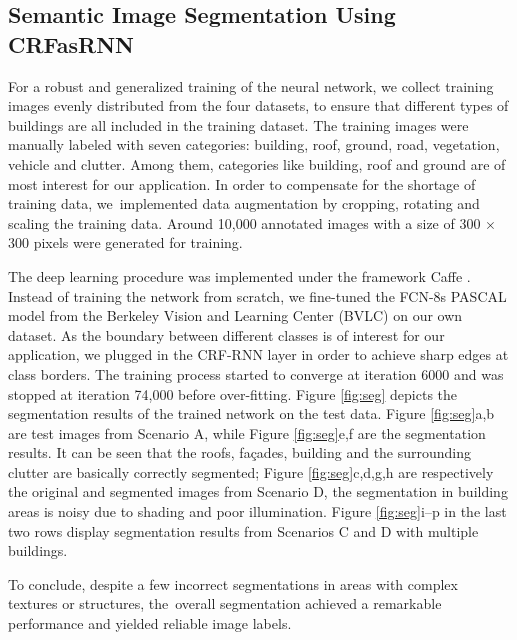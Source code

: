 \documentclass[remotesensing,article,accept,moreauthors,pdftex,10pt,a4paper]{mdpi}
\theoremstyle{mdpi}
\newcounter{ex}
\newcounter{re}
\begin{document}

\subsection{Semantic Image Segmentation Using CRFasRNN}
For a robust and generalized training of the neural network, we collect training images evenly distributed from the four datasets, to ensure that different types of buildings are all included in the training dataset. The training images were manually labeled with seven categories: building, roof, ground, road, vegetation, vehicle and clutter. Among them, categories like building, roof and ground are of most interest for our application. In order to compensate for the shortage of training data, we~implemented data augmentation by cropping, rotating and scaling the training data. Around 10,000 annotated images with a size of 300 $\times$ 300 pixels were generated for training.


The deep learning procedure was implemented under the framework Caffe \cite{jia2014caffe}. Instead of training the network from scratch, we fine-tuned the FCN-8s PASCAL model from the Berkeley Vision and Learning Center (BVLC) on our own dataset. As the boundary between different classes is of interest for our application, we plugged in the CRF-RNN layer in order to achieve sharp edges at class borders. The training process started to converge at iteration 6000 and was stopped at iteration 74,000 before over-fitting. Figure \ref{fig:seg} depicts the segmentation results of the trained network on the test data. Figure \ref{fig:seg}a,b are test images from Scenario A, while Figure \ref{fig:seg}e,f are the segmentation results. It can be seen that the roofs, fa\c{c}ades, building and the surrounding clutter are basically correctly segmented; Figure \ref{fig:seg}c,d,g,h are respectively the original and segmented images from Scenario D, the segmentation in building areas is noisy due to shading and poor illumination. Figure \ref{fig:seg}i--p in the last two rows display segmentation results from Scenarios C and D with multiple buildings. 

To conclude, despite a few incorrect segmentations in areas with complex textures or structures, the~overall segmentation achieved a remarkable performance and yielded reliable image labels. 
\end{document}
